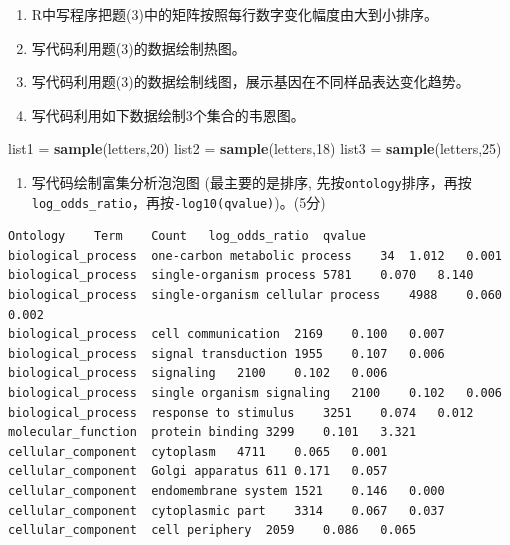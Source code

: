 \documentclass[]{article}
\newenvironment{Shaded}{\begin{snugshade}}{\end{snugshade}}
\newcommand{\KeywordTok}[1]{\textcolor[rgb]{0.13,0.29,0.53}{\textbf{{#1}}}}
\newcommand{\DecValTok}[1]{\textcolor[rgb]{0.00,0.00,0.81}{{#1}}}
\newcommand{\StringTok}[1]{\textcolor[rgb]{0.31,0.60,0.02}{{#1}}}
\newcommand{\NormalTok}[1]{{#1}}
\providecommand{\tightlist}{%
  \setlength{\itemsep}{0pt}\setlength{\parskip}{0pt}}
\numberwithin{figure}{section}
\numberwithin{table}{section}
\theoremstyle{definition}
\theoremstyle{definition}
\theoremstyle{definition}
\theoremstyle{remark}
\begin{document}
\begin{enumerate}
\def\labelenumi{\arabic{enumi}.}
\setcounter{enumi}{4}
\item
  R中写程序把题(3)中的矩阵按照每行数字变化幅度由大到小排序。
\item
  写代码利用题(3)的数据绘制热图。
\item
  写代码利用题(3)的数据绘制线图，展示基因在不同样品表达变化趋势。
\item
  写代码利用如下数据绘制3个集合的韦恩图。
\end{enumerate}

\begin{Shaded}
\begin{Highlighting}[]
\NormalTok{list1 =}\StringTok{ }\KeywordTok{sample}\NormalTok{(letters,}\DecValTok{20}\NormalTok{)}
\NormalTok{list2 =}\StringTok{ }\KeywordTok{sample}\NormalTok{(letters,}\DecValTok{18}\NormalTok{)}
\NormalTok{list3 =}\StringTok{ }\KeywordTok{sample}\NormalTok{(letters,}\DecValTok{25}\NormalTok{)}
\end{Highlighting}
\end{Shaded}

\begin{enumerate}
\def\labelenumi{\arabic{enumi}.}
\setcounter{enumi}{8}
\tightlist
\item
  写代码绘制富集分析泡泡图 (最主要的是排序,
  先按\texttt{ontology}排序，再按\texttt{log\_odds\_ratio}，再按\texttt{-log10(qvalue)})。(5分)
\end{enumerate}

\begin{verbatim}
Ontology    Term    Count   log_odds_ratio  qvalue
biological_process  one-carbon metabolic process    34  1.012   0.001
biological_process  single-organism process 5781    0.070   8.140
biological_process  single-organism cellular process    4988    0.060   0.002
biological_process  cell communication  2169    0.100   0.007
biological_process  signal transduction 1955    0.107   0.006
biological_process  signaling   2100    0.102   0.006
biological_process  single organism signaling   2100    0.102   0.006
biological_process  response to stimulus    3251    0.074   0.012
molecular_function  protein binding 3299    0.101   3.321
cellular_component  cytoplasm   4711    0.065   0.001
cellular_component  Golgi apparatus 611 0.171   0.057
cellular_component  endomembrane system 1521    0.146   0.000
cellular_component  cytoplasmic part    3314    0.067   0.037
cellular_component  cell periphery  2059    0.086   0.065
\end{verbatim}
\end{document}
